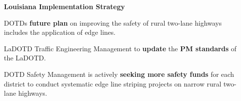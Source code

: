 \documentclass[final]{beamer}
\newlength{\sepwid}
\newlength{\onecolwid}
\newlength{\twocolwid}
\begin{document}
\begin{frame}[t]
\begin{columns}[t]
\begin{column}{\twocolwid}
\begin{columns}[t,totalwidth=\twocolwid]
\begin{column}{\onecolwid}
           \begin{block}{\textbf{Louisiana Implementation Strategy}}
    \begin{itemize}
          {\item DOTD\textquotesingle s \textbf{future plan} on improving the safety of rural two-lane highways includes the application of edge lines.
            \item LaDOTD Traffic Engineering Management to \textbf{update} the \textbf{PM standards} of the LaDOTD.\\
    \item DOTD Safety Management is actively \textbf{seeking more safety funds} for each district to conduct systematic edge line striping projects on narrow rural two-lane highways.
    }
\end{itemize}
        \end{block}
      \end{column}
    \end{columns}
  \end{column}
  \begin{column}{\sepwid}\end{column}			%
\end{columns}
\end{frame}
\end{document}
